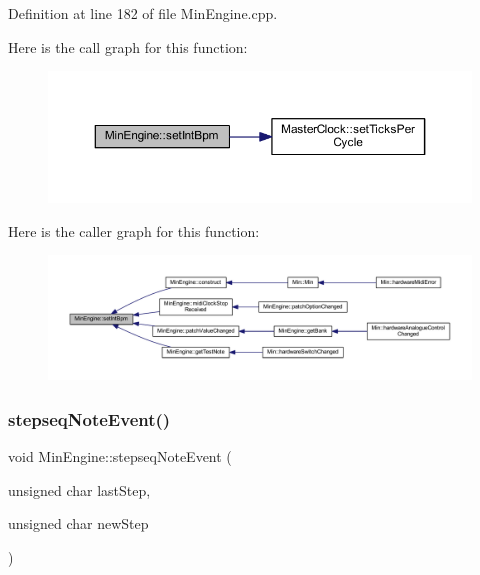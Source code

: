 Definition at line 182 of file Min\+Engine.\+cpp.

Here is the call graph for this function\+:
\nopagebreak
\begin{figure}[H]
\begin{center}
\leavevmode
\includegraphics[width=350pt]{class_min_engine_a7ef07f3911096d861e030cccfd8899b5_cgraph}
\end{center}
\end{figure}
Here is the caller graph for this function\+:
\nopagebreak
\begin{figure}[H]
\begin{center}
\leavevmode
\includegraphics[width=350pt]{class_min_engine_a7ef07f3911096d861e030cccfd8899b5_icgraph}
\end{center}
\end{figure}
\mbox{\label{class_min_engine_a46ab2a887b8c83c9b484304778bc01a1}} 
\subsubsection{\texorpdfstring{stepseq\+Note\+Event()}{stepseqNoteEvent()}}
{\footnotesize\ttfamily void Min\+Engine\+::stepseq\+Note\+Event (\begin{DoxyParamCaption}\item[{unsigned char}]{last\+Step,  }\item[{unsigned char}]{new\+Step }\end{DoxyParamCaption})\hspace{0.3cm}{\ttfamily [virtual]}}



